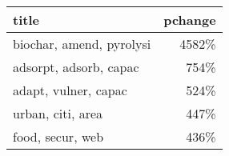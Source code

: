 \begin{tabular}{p{1.2cm}r}
\toprule
                    title &  pchange \\
\midrule
 biochar, amend, pyrolysi &    4582\% \\
   adsorpt, adsorb, capac &     754\% \\
     adapt, vulner, capac &     524\% \\
        urban, citi, area &     447\% \\
         food, secur, web &     436\% \\
\bottomrule
\end{tabular}
